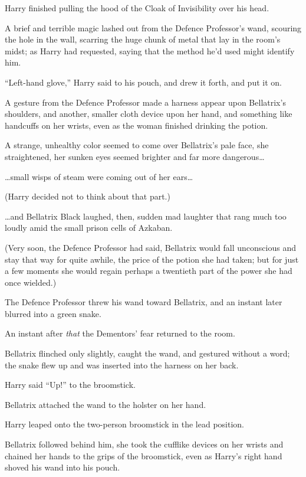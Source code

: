 Harry finished pulling the hood of the Cloak of Invisibility over his
head.

A brief and terrible magic lashed out from the Defence Professor's wand,
scouring the hole in the wall, scarring the huge chunk of metal that lay
in the room's midst; as Harry had requested, saying that the method he'd
used might identify him.

``Left-hand glove,'' Harry said to his pouch, and drew it forth, and put
it on.

A gesture from the Defence Professor made a harness appear upon
Bellatrix's shoulders, and another, smaller cloth device upon her hand,
and something like handcuffs on her wrists, even as the woman finished
drinking the potion.

A strange, unhealthy color seemed to come over Bellatrix's pale face,
she straightened, her sunken eyes seemed brighter and far more
dangerous\ldots{}

\ldots{}small wisps of steam were coming out of her ears\ldots{}

(Harry decided not to think about that part.)

\ldots{}and Bellatrix Black laughed, then, sudden mad laughter that rang
much too loudly amid the small prison cells of Azkaban.

(Very soon, the Defence Professor had said, Bellatrix would fall
unconscious and stay that way for quite awhile, the price of the potion
she had taken; but for just a few moments she would regain perhaps a
twentieth part of the power she had once wielded.)

The Defence Professor threw his wand toward Bellatrix, and an instant
later blurred into a green snake.

An instant after \emph{that} the Dementors' fear returned to the room.

Bellatrix flinched only slightly, caught the wand, and gestured without
a word; the snake flew up and was inserted into the harness on her back.

Harry said ``Up!'' to the broomstick.

Bellatrix attached the wand to the holster on her hand.

Harry leaped onto the two-person broomstick in the lead position.

Bellatrix followed behind him, she took the cufflike devices on her
wrists and chained her hands to the grips of the broomstick, even as
Harry's right hand shoved his wand into his pouch.

